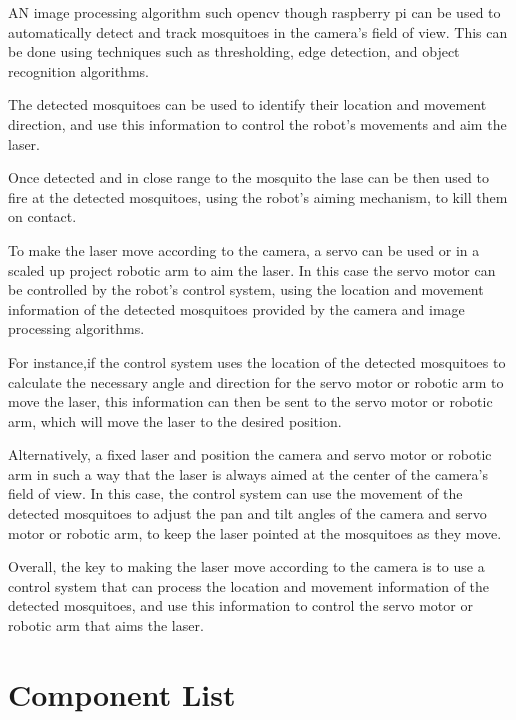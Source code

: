 \documentclass[11pt]{article}
\begin{document}
AN image processing algorithm such opencv though raspberry pi can be used  to automatically detect and track mosquitoes in the camera's field of view. This can be done using techniques such as thresholding, edge detection, and object recognition algorithms.

The detected mosquitoes can be used to identify their location and movement direction, and use this information to control the robot's movements and aim the laser.

Once detected and in close range to the mosquito the lase can be then used to fire at the detected mosquitoes, using the robot's aiming mechanism, to kill them on contact.


To make the laser move according to the camera, a servo can be used or in a scaled up project robotic arm to aim the laser. In this case the servo motor can be controlled by the robot's control system, using the location and movement information of the detected mosquitoes provided by the camera and image processing algorithms.

For instance,if the control system uses the location of the detected mosquitoes to calculate the necessary angle and direction for the servo motor or robotic arm to move the laser, this information can then be sent to the servo motor or robotic arm, which will move the laser to the desired position.

Alternatively, a fixed laser and position the camera and servo motor or robotic arm in such a way that the laser is always aimed at the center of the camera's field of view. In this case, the control system can use the movement of the detected mosquitoes to adjust the pan and tilt angles of the camera and servo motor or robotic arm, to keep the laser pointed at the mosquitoes as they move.

Overall, the key to making the laser move according to the camera is to use a control system that can process the location and movement information of the detected mosquitoes, and use this information to control the servo motor or robotic arm that aims the laser.








	

	
	

	\section{Component List}
\end{document}
